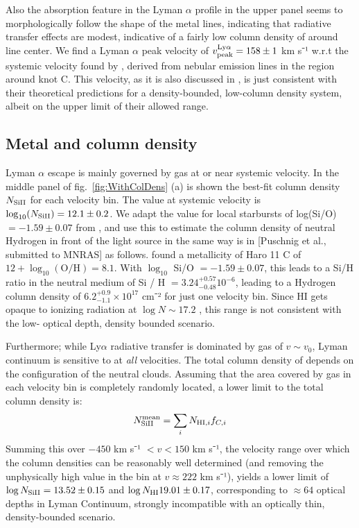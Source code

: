 \documentclass[twocolumn]{aastex61}
\begin{document}
Also the absorption feature in the Lyman $\alpha$ profile in the upper
panel seems to morphologically follow the shape of the metal lines,
indicating that radiative transfer effects are modest, indicative of a
fairly low column density of  around line center. We find a
Lyman $\alpha$ peak velocity of
$v_{\rm peak}^{\mathrm{Ly}\alpha} = 158 \pm 1$ km s⁻¹ w.r.t the systemic
velocity found by \citet{Sandberg2013}, derived from nebular emission
lines in the region around knot C. This velocity, as it is also
discussed in \citet{Verhamme2015}, is just consistent with their
theoretical predictions for a density-bounded, low-column density
system, albeit on the upper limit of their allowed range.

\subsection{Metal and  column
density}\label{metal-and-column-density}

Lyman $\alpha$ escape is mainly governed by gas at or near systemic
velocity. In the middle panel of fig.~\ref{fig:WithColDens} (a) is shown
the best-fit column density $N_{\rm Si II}$ for each velocity bin. The
value at systemic velocity is $\log_{10}(N_{\rm Si II}) = 12.1 \pm 0.2$.
We adapt the value for local starbursts of log(Si/O) $= -1.59 \pm 0.07$
from \citet{Garnett1995}, and use this to estimate the column density of
neutral Hydrogen in front of the light source in the same way is in
{[}Puschnig et al., submitted to MNRAS{]} as follows. \citet{Guseva2012}
found a metallicity of Haro 11 C of $12 + \log_{10}(\text{O/H}) = 8.1$.
With $\log_{10}$ Si/O $= -1.59 \pm 0.07$, this leads to a Si/H ratio in
the neutral medium of Si / H $= 3.24^{+0.57}_{-0.48} 10^{-6}$, leading
to a Hydrogen column density of $6.2^{+0.9}_{-1.1} \times 10^{17}$ cm⁻²
for just one velocity bin. Since HI gets opaque to ionizing radiation at
$\log N \sim 17.2$ \citep{Verhamme2015}, this range is not consistent
with the low- optical depth, density bounded scenario.

Furthermore; while Ly$\alpha$ radiative transfer is dominated by gas of
$v \sim v_0$, Lyman continuum is sensitive to  at \emph{all}
velocities. The total column density of  depends on the
configuration of the neutral clouds. Assuming that the area covered by
gas in each velocity bin is completely randomly located, a lower limit
to the total column density is:
%
\begin{equation}
\label{NHImean}
N_{\rm Si II}^{\rm mean} = \sum_i N_{\text{HI}, i} f_{C, i}
\end{equation}
%
 Summing this over $-450$ km s⁻¹ $< v < 150$ km s⁻¹, the velocity range
over which the column densities can be reasonably well determined (and
removing the unphysically high value in the bin at $v \approx 222$ km
s⁻¹), yields a lower limit of $\log N_{\rm Si II} = 13.52 \pm 0.15$ and
$\log N_{\rm H I} 19.01 \pm 0.17$, corresponding to $\approx 64$ optical
depths in Lyman Continuum, strongly incompatible with an optically thin,
density-bounded scenario.
\end{document}
